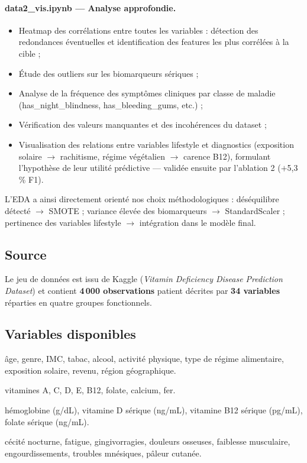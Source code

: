 \documentclass[12pt,a4paper]{article}
\begin{document}
\paragraph{data2\_vis.ipynb — Analyse approfondie.}
\begin{itemize}[leftmargin=2em]
    \item Heatmap des corrélations entre toutes les variables : détection des
        redondances éventuelles et identification des features les plus corrélées
        à la cible ;
    \item Étude des outliers sur les biomarqueurs sériques ;
    \item Analyse de la fréquence des symptômes cliniques par classe de maladie
        (has\_night\_blindness, has\_bleeding\_gums, etc.) ;
    \item Vérification des valeurs manquantes et des incohérences du dataset ;
    \item Visualisation des relations entre variables lifestyle et diagnostics
        (exposition solaire $\to$ rachitisme, régime végétalien $\to$ carence B12),
        formulant l'hypothèse de leur utilité prédictive — validée ensuite par
        l'ablation 2 ($+$5,3\,\% F1).
\end{itemize}

L'EDA a ainsi directement orienté nos choix méthodologiques : déséquilibre
détecté $\to$ SMOTE ; variance élevée des biomarqueurs $\to$ StandardScaler ;
pertinence des variables lifestyle $\to$ intégration dans le modèle final.

\subsection{Source}

Le jeu de données est issu de Kaggle
(\emph{Vitamin Deficiency Disease Prediction Dataset}) et contient
\textbf{4\,000 observations} patient décrites par \textbf{34 variables}
réparties en quatre groupes fonctionnels.

\subsection{Variables disponibles}

\begin{description}[leftmargin=2em]
    \item[Socio-démographiques et comportementales (10)] âge, genre, IMC,
        tabac, alcool, activité physique, type de régime alimentaire, exposition
        solaire, revenu, région géographique.
    \item[Apports nutritionnels en \% des AJR (8)] vitamines A, C, D, E, B12,
        folate, calcium, fer.
    \item[Biomarqueurs sériques (4)] hémoglobine (g/dL), vitamine D sérique
        (ng/mL), vitamine B12 sérique (pg/mL), folate sérique (ng/mL).
    \item[Symptômes cliniques (8 retenus)] cécité nocturne, fatigue,
        gingivorragies, douleurs osseuses, faiblesse musculaire, engourdissements,
        troubles mnésiques, pâleur cutanée.
\end{description}
\end{document}
